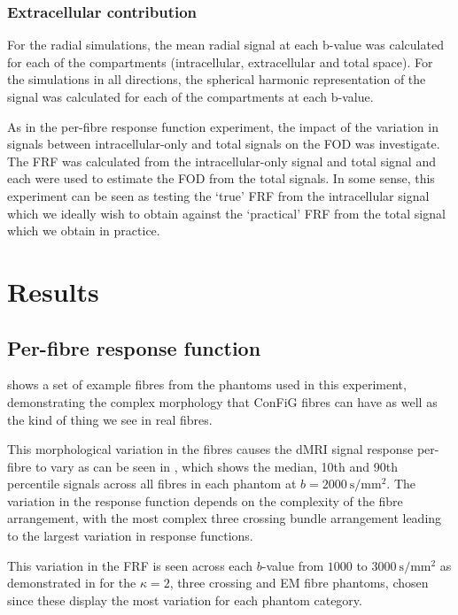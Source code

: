 \subsubsection{Extracellular contribution}
\label{sec:frf_sig_proc_extra}
For the radial simulations, the mean radial signal at each b-value was calculated for each of the compartments (intracellular, extracellular and total space). For the simulations in all directions, the spherical harmonic representation of the signal was calculated for each of the compartments at each b-value.

As in the per-fibre response function experiment, the impact of the variation in signals between intracellular-only and total signals on the \ac{FOD} was investigate. The \ac{FRF} was calculated from the intracellular-only signal and total signal and each were used to estimate the \ac{FOD} from the total signals. In some sense, this experiment can be seen as testing the `true' \ac{FRF} from the intracellular signal which we ideally wish to obtain against the `practical' \ac{FRF} from the total signal which we obtain in practice.


\section{Results}
\label{sec:frf_results}


\subsection{Per-fibre response function}
\label{sec:frf_res_per_fibre}
 shows a set of example fibres from the phantoms used in this experiment, demonstrating the complex morphology that ConFiG fibres can have as well as the kind of thing we see in real fibres.

This morphological variation in the fibres causes the \ac{dMRI} signal response per-fibre to vary as can be seen in , which shows the median, 10th and 90th percentile signals across all fibres in each phantom at $b=\SI{2000}{\second\per\milli\metre\squared}$.
The variation in the response function depends on the complexity of the fibre arrangement, with the most complex three crossing bundle arrangement leading to the largest variation in response functions.

This variation in the \ac{FRF} is seen across each $b$-value from $1000$ to $\SI{3000}{\second\per\milli\metre\squared}$ as demonstrated in  for the $\kappa=2$, three crossing and EM fibre phantoms, chosen since these display the most variation for each phantom category.


